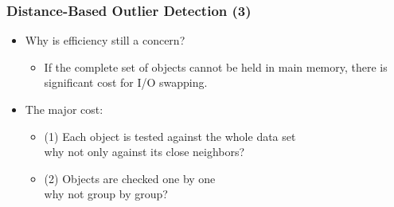 \documentclass[aspectratio=169,t,xcolor=dvipsnames]{beamer}
\begin{document}
%

\begin{frame}
	\frametitle{Distance-Based Outlier Detection (3)}
	\begin{itemize}
		\item Why is efficiency still a concern?
		      \begin{itemize}
		      	\item If the complete set of objects cannot be held in main memory, there is significant cost for I/O swapping.
		      \end{itemize}
		\item The major cost:
		      \begin{itemize}
		      	\item (1)  Each object is tested against the whole data set\\
		      	why not only against its close neighbors?
		      	\item (2)  Objects are checked one by one\\		      	
		      	why not group by group?
		      \end{itemize}
	\end{itemize}
\end{frame}

%
\end{document}
